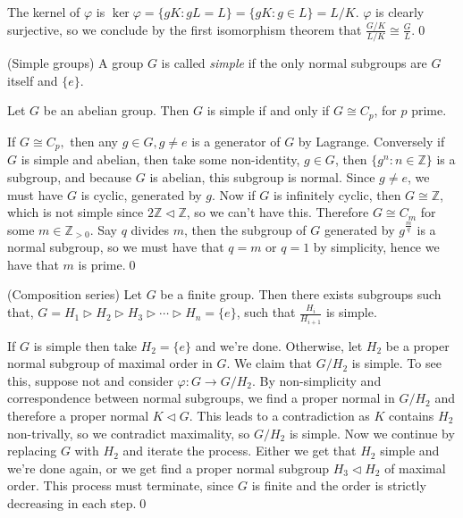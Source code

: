 \documentclass{article}
\newcommand{\nrm}{\triangleleft}
\begin{document}
The kernel of $ \varphi $ is $ \ker \varphi = \{gK:gL=L\} =\{gK: g\in L\} = L/K $. $ \varphi $ is clearly surjective, so we conclude by the first isomorphism theorem that $ \frac{G/K}{L/K}\cong \frac GL $.\qed
\begin{definition}
	(Simple groups) A group $ G $ is called \textit{simple} if the only normal subgroups are $ G $ itself and $ \{ e \} $.
\end{definition}
\begin{proposition}
  Let $ G $ be an abelian group. Then $ G $ is simple if and only if  $ G\cong C_p $, for $ p $ prime.
\end{proposition}
\pf If $ G\cong C_p, $ then any $ g\in G, g\ne e $ is a generator of $ G $ by Lagrange. Conversely if $ G $ is simple and abelian, then take some non-identity, $ g\in G $, then $ \{g^n :n\in \mathbb Z\} $ is a subgroup, and because $ G $ is abelian, this subgroup is normal. Since $ g\ne e $, we must have $ G $ is cyclic, generated by $ g $. Now if $ G $ is infinitely cyclic, then $ G\cong\mathbb Z $, which is not simple since $ 2\mathbb Z\nrm \mathbb Z $, so we can't have this. Therefore $ G\cong C_m $ for some $ m\in \mathbb Z_{>0} $. Say $ q $ divides $ m $, then the subgroup of $ G $ generated by $ g^{\frac mq} $ is a normal subgroup, so we must have that $ q=m $ or $ q=1 $ by simplicity, hence we have that $ m $ is prime.\qed
\begin{theorem}
	(Composition series) Let $ G $ be a finite group. Then there exists subgroups such that, $ G=H_1\triangleright H_2\triangleright H_3\triangleright\cdots \triangleright H_n=\{e\} $, such that $ \frac {H_i}{H_{i+1}} $ is simple.
\end{theorem}
\pf If $ G $ is simple then take $ H_2=\{e\} $ and we're done. Otherwise, let $ H_2 $ be a proper normal subgroup of maximal order in $ G $. We claim that $ G/H_2 $ is simple. To see this, suppose not and consider $ \varphi: G\to G/H_2 $.
 By non-simplicity and correspondence between normal subgroups, we find a proper normal in $ G/H_2 $ and therefore a proper normal $ K\nrm G $. This leads to a contradiction as $ K $ contains $ H_2 $ non-trivally, so we contradict maximality, so $ G/H_2 $ is simple. Now we continue by replacing $ G $ with $ H_2 $ and iterate the process. Either we get that $ H_2 $ simple and we're done again, or we get find a proper normal subgroup $ H_3\nrm H_2 $ of maximal order. This process must terminate, since $ G $ is finite and the order is strictly decreasing in each step.\qed
\end{document}
